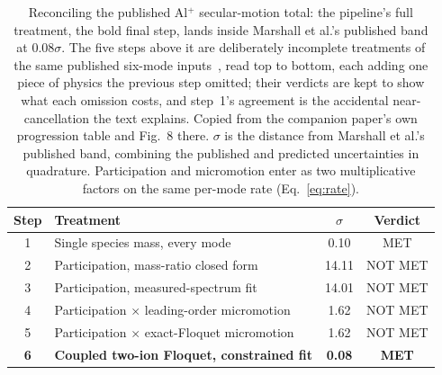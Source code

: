 \documentclass[aps,pra,superscriptaddress,groupedaddress,nofootinbib]{revtex4-2}
\begin{document}
\begin{table}[t]
\centering
\caption{Reconciling the published Al$^+$ secular-motion total: the
pipeline's full treatment, the bold final step, lands inside Marshall
et al.'s published band at $0.08\sigma$. The five steps above it are
deliberately incomplete treatments of the same published six-mode
inputs~\cite{Marshall2025}, read top to bottom, each adding one piece
of physics the previous step omitted; their verdicts are kept to show
what each omission costs, and step~1's agreement is the accidental
near-cancellation the text explains. Copied from the companion
paper's own progression table and Fig.~8 there. $\sigma$ is the
distance from Marshall et al.'s published band, combining the
published and predicted uncertainties in quadrature. Participation
and micromotion enter as two multiplicative factors on the same
per-mode rate (Eq.~\eqref{eq:rate}).}
\label{tab:motional}
\begin{tabular}{clcc}
\toprule
Step & Treatment & $\sigma$ & Verdict \\
\midrule
1 & Single species mass, every mode & 0.10 & MET \\
2 & Participation, mass-ratio closed form & 14.11 & NOT MET \\
3 & Participation, measured-spectrum fit & 14.01 & NOT MET \\
4 & Participation $\times$ leading-order micromotion & 1.62 & NOT MET \\
5 & Participation $\times$ exact-Floquet micromotion & 1.62 & NOT MET \\
\textbf{6} & \textbf{Coupled two-ion Floquet, constrained fit} & \textbf{0.08} & \textbf{MET} \\
\bottomrule
\end{tabular}
\end{table}
\end{document}

